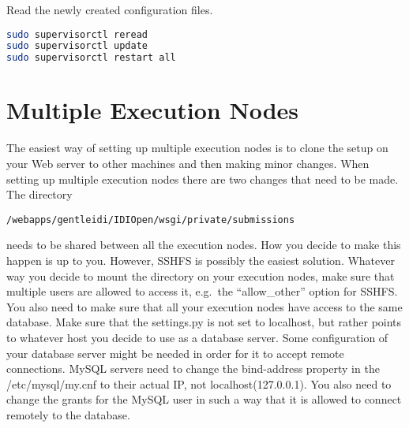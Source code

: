 Read the newly created configuration files.
\begin{lstlisting}[language=bash]
sudo supervisorctl reread
sudo supervisorctl update
sudo supervisorctl restart all
\end{lstlisting}

\section{Multiple Execution Nodes}
The easiest way of setting up multiple execution nodes is to clone the
setup on your Web server to other machines and then making minor
changes.
When setting up multiple execution nodes there are two changes that need to be
made. The directory \begin{verbatim}/webapps/gentleidi/IDIOpen/wsgi/private/submissions\end{verbatim}
needs to be shared between all the execution nodes. How you decide to make this
happen is up to you. However, SSHFS is possibly the easiest solution. Whatever
way you decide to mount the directory on your execution nodes, make sure that
multiple users are allowed to access it, e.g.\ the ``allow\_other''
option for SSHFS.
You also need to make sure that all your execution nodes have access to the
same database. Make sure that the settings.py is not set to localhost, but
rather points to whatever host you decide to use as a database server. Some
configuration of your database server might be needed in order for it to accept
remote connections. MySQL servers need to change the bind-address property in
the /etc/mysql/my.cnf to their actual IP, not localhost(127.0.0.1).
You also need to change the grants for the MySQL user in such a way that it is
allowed to connect remotely to the database.
